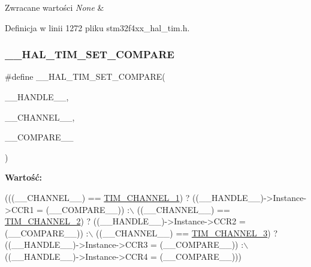 \begin{DoxyRetVals}{Zwracane wartości}
{\em None} & \\
\hline
\end{DoxyRetVals}


Definicja w linii 1272 pliku stm32f4xx\+\_\+hal\+\_\+tim.\+h.

\mbox{\label{group___t_i_m___exported___macros_ga300d0c9624c3b072d3afeb7cef639b66}} 
\subsubsection{\texorpdfstring{\+\_\+\+\_\+\+H\+A\+L\+\_\+\+T\+I\+M\+\_\+\+S\+E\+T\+\_\+\+C\+O\+M\+P\+A\+RE}{\_\_HAL\_TIM\_SET\_COMPARE}}
{\footnotesize\ttfamily \#define \+\_\+\+\_\+\+H\+A\+L\+\_\+\+T\+I\+M\+\_\+\+S\+E\+T\+\_\+\+C\+O\+M\+P\+A\+RE(\begin{DoxyParamCaption}\item[{}]{\+\_\+\+\_\+\+H\+A\+N\+D\+L\+E\+\_\+\+\_\+,  }\item[{}]{\+\_\+\+\_\+\+C\+H\+A\+N\+N\+E\+L\+\_\+\+\_\+,  }\item[{}]{\+\_\+\+\_\+\+C\+O\+M\+P\+A\+R\+E\+\_\+\+\_\+ }\end{DoxyParamCaption})}

{\bfseries Wartość\+:}
\begin{DoxyCode}
(((\_\_CHANNEL\_\_) == \hyperlink{group___t_i_m___channel_ga6b1541e4a49d62610899e24bf23f4879}{TIM\_CHANNEL\_1}) ? ((\_\_HANDLE\_\_)->Instance->CCR1 = (\_\_COMPARE\_\_)) :\(\backslash\)
   ((\_\_CHANNEL\_\_) == \hyperlink{group___t_i_m___channel_ga33e02d43345a7ac5886f01b39e4f7ccd}{TIM\_CHANNEL\_2}) ? ((\_\_HANDLE\_\_)->Instance->CCR2 = (\_\_COMPARE\_\_)) :\(\backslash\)
   ((\_\_CHANNEL\_\_) == \hyperlink{group___t_i_m___channel_ga4ea100c1789b178f3cb46721b7257e2d}{TIM\_CHANNEL\_3}) ? ((\_\_HANDLE\_\_)->Instance->CCR3 = (\_\_COMPARE\_\_)) :\(\backslash\)
   ((\_\_HANDLE\_\_)->Instance->CCR4 = (\_\_COMPARE\_\_)))
\end{DoxyCode}


